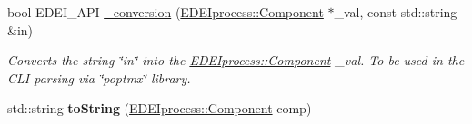 \begin{DoxyCompactItemize}
bool EDEI\_\-API \hyperlink{group__edeiedei_gadee6c8302767b3a1728004f89565013c}{\_\-conversion} (\hyperlink{classEDEIprocess_a745d55d7f97f3aafa52998d49d9acde4}{EDEIprocess::Component} $\ast$\_\-val, const std::string \&in)
\begin{DoxyCompactList}\small\item\em Converts the string \char`\"{}in\char`\"{} into the \hyperlink{classEDEIprocess_a745d55d7f97f3aafa52998d49d9acde4}{EDEIprocess::Component} \_\-val. To be used in the CLI parsing via \char`\"{}poptmx\char`\"{} library. \item\end{DoxyCompactList}\item 
\hypertarget{group__edeiedei_ga4ef6a8be61335bdb2faa146459430946}{
std::string {\bfseries toString} (\hyperlink{classEDEIprocess_a745d55d7f97f3aafa52998d49d9acde4}{EDEIprocess::Component} comp)}
\label{group__edeiedei_ga4ef6a8be61335bdb2faa146459430946}


\end{DoxyCompactItemize}
